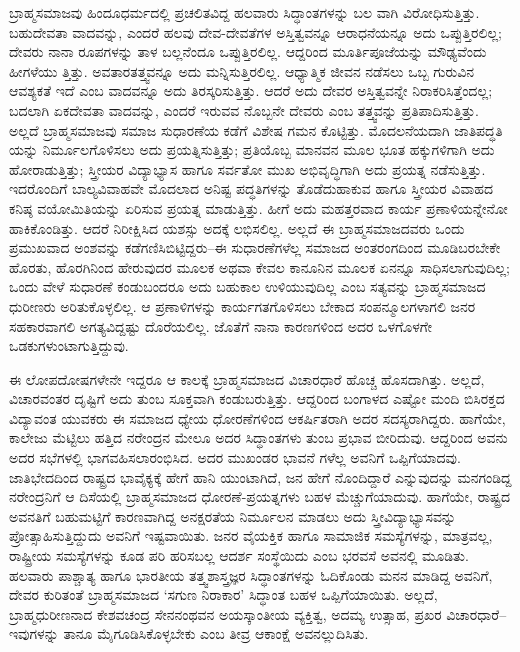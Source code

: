 ಬ್ರಾಹ್ಮಸಮಾಜವು ಹಿಂದೂಧರ್ಮದಲ್ಲಿ ಪ್ರಚಲಿತವಿದ್ದ ಹಲವಾರು ಸಿದ್ಧಾಂತಗಳನ್ನು ಬಲ ವಾಗಿ ವಿರೋಧಿಸುತ್ತಿತ್ತು. ಬಹುದೇವತಾ ವಾದವನ್ನು, ಎಂದರೆ ಹಲವು ದೇವ-ದೇವತೆಗಳ ಅಸ್ತಿತ್ವವನ್ನೂ ಆರಾಧನೆಯನ್ನೂ ಅದು ಒಪ್ಪುತ್ತಿರಲಿಲ್ಲ; ದೇವರು ನಾನಾ ರೂಪಗಳನ್ನು ತಾಳ ಬಲ್ಲನೆಂದೂ ಒಪ್ಪುತ್ತಿರಲಿಲ್ಲ. ಆದ್ದರಿಂದ ಮೂರ್ತಿಪೂಜೆಯನ್ನು ಮೌಢ್ಯವೆಂದು ಹೀಗಳೆಯು ತ್ತಿತ್ತು. ಅವತಾರತತ್ತ್ವವನ್ನೂ ಅದು ಮನ್ನಿಸುತ್ತಿರಲಿಲ್ಲ. ಆಧ್ಯಾತ್ಮಿಕ ಜೀವನ ನಡೆಸಲು ಒಬ್ಬ ಗುರುವಿನ ಆವಶ್ಯಕತೆ ಇದೆ ಎಂಬ ವಾದವನ್ನೂ ಅದು ತಿರಸ್ಕರಿಸುತ್ತಿತ್ತು. ಆದರೆ ಅದು ದೇವರ ಅಸ್ತಿತ್ವವನ್ನೇ ನಿರಾಕರಿಸಿತ್ತೆಂದಲ್ಲ; ಬದಲಾಗಿ ಏಕದೇವತಾ ವಾದವನ್ನು, ಎಂದರೆ ಇರುವವ ನೊಬ್ಬನೇ ದೇವರು ಎಂಬ ತತ್ತ್ವವನ್ನು ಪ್ರತಿಪಾದಿಸುತ್ತಿತ್ತು. ಅಲ್ಲದೆ ಬ್ರಾಹ್ಮಸಮಾಜವು ಸಮಾಜ ಸುಧಾರಣೆಯ ಕಡೆಗೆ ವಿಶೇಷ ಗಮನ ಕೊಟ್ಟಿತ್ತು. ಮೊದಲನೆಯದಾಗಿ ಜಾತಿಪದ್ಧತಿ ಯನ್ನು ನಿರ್ಮೂಲಗೊಳಿಸಲು ಅದು ಪ್ರಯತ್ನಿಸುತ್ತಿತ್ತು; ಪ್ರತಿಯೊಬ್ಬ ಮಾನವನ ಮೂಲ ಭೂತ ಹಕ್ಕುಗಳಿಗಾಗಿ ಅದು ಹೋರಾಡುತ್ತಿತ್ತು; ಸ್ತ್ರೀಯರ ವಿದ್ಯಾಭ್ಯಾಸ ಹಾಗೂ ಸರ್ವತೋ ಮುಖ ಅಭಿವೃದ್ಧಿಗಾಗಿ ಅದು ಪ್ರಯತ್ನ ನಡೆಸುತ್ತಿತ್ತು. ಇದರೊಂದಿಗೆ ಬಾಲ್ಯವಿವಾಹವೇ ಮೊದಲಾದ ಅನಿಷ್ಟ ಪದ್ಧತಿಗಳನ್ನು ತೊಡೆದುಹಾಕುವ ಹಾಗೂ ಸ್ತ್ರೀಯರ ವಿವಾಹದ ಕನಿಷ್ಠ ವಯೋಮಿತಿಯನ್ನು ಏರಿಸುವ ಪ್ರಯತ್ನ ಮಾಡುತ್ತಿತ್ತು. ಹೀಗೆ ಅದು ಮಹತ್ತರವಾದ ಕಾರ್ಯ ಪ್ರಣಾಳಿಯನ್ನೇನೋ ಹಾಕಿಕೊಂಡಿತ್ತು. ಆದರೆ ನಿರೀಕ್ಷಿಸಿದ ಯಶಸ್ಸು ಅದಕ್ಕೆ ಲಭಿಸಲಿಲ್ಲ. ಅಲ್ಲದೆ ಈ ಬ್ರಾಹ್ಮಸಮಾಜದವರು ಒಂದು ಪ್ರಮುಖವಾದ ಅಂಶವನ್ನು ಕಡೆಗಣಿಸಿಬಿಟ್ಟಿದ್ದರು–ಈ ಸುಧಾರಣೆಗಳೆಲ್ಲ ಸಮಾಜದ ಅಂತರಂಗದಿಂದ ಮೂಡಿಬರಬೇಕೇ ಹೊರತು, ಹೊರಗಿನಿಂದ ಹೇರುವುದರ ಮೂಲಕ ಅಥವಾ ಕೇವಲ ಕಾನೂನಿನ ಮೂಲಕ ಏನನ್ನೂ ಸಾಧಿಸಲಾಗುವುದಿಲ್ಲ; ಒಂದು ವೇಳೆ ಸುಧಾರಣೆ ಕಂಡುಬಂದರೂ ಅದು ಬಹುಕಾಲ ಉಳಿಯುವುದಿಲ್ಲ ಎಂಬ ಸತ್ಯವನ್ನು ಬ್ರಾಹ್ಮಸಮಾಜದ ಧುರೀಣರು ಅರಿತುಕೊಳ್ಳಲಿಲ್ಲ. ಆ ಪ್ರಣಾಳಿಗಳನ್ನು ಕಾರ್ಯಗತಗೊಳಿಸಲು ಬೇಕಾದ ಸಂಪನ್ಮೂಲಗಳಾಗಲಿ ಜನರ ಸಹಕಾರವಾಗಲಿ ಅಗತ್ಯವಿದ್ದಷ್ಟು ದೊರೆಯಲಿಲ್ಲ. ಜೊತೆಗೆ ನಾನಾ ಕಾರಣಗಳಿಂದ ಅದರ ಒಳಗೊಳಗೇ ಒಡಕುಗಳುಂಟಾಗುತ್ತಿದ್ದುವು.

ಈ ಲೋಪದೋಷಗಳೇನೇ ಇದ್ದರೂ ಆ ಕಾಲಕ್ಕೆ ಬ್ರಾಹ್ಮಸಮಾಜದ ವಿಚಾರಧಾರೆ ಹೊಚ್ಚ ಹೊಸದಾಗಿತ್ತು. ಅಲ್ಲದೆ, ವಿಚಾರವಂತರ ದೃಷ್ಟಿಗೆ ಅದು ತುಂಬ ಸೂಕ್ತವಾಗಿ ಕಂಡುಬರುತ್ತಿತ್ತು. ಆದ್ದರಿಂದ ಬಂಗಾಳದ ಎಷ್ಟೋ ಮಂದಿ ಬಿಸಿರಕ್ತದ ವಿದ್ಯಾವಂತ ಯುವಕರು ಈ ಸಮಾಜದ ಧ್ಯೇಯ ಧೋರಣೆಗಳಿಂದ ಆಕರ್ಷಿತರಾಗಿ ಅದರ ಸದಸ್ಯರಾಗಿದ್ದರು. ಹಾಗೆಯೇ, ಕಾಲೇಜು ಮೆಟ್ಟಿಲು ಹತ್ತಿದ ನರೇಂದ್ರನ ಮೇಲೂ ಅದರ ಸಿದ್ಧಾಂತಗಳು ತುಂಬ ಪ್ರಭಾವ ಬೀರಿದುವು. ಆದ್ದರಿಂದ ಅವನು ಅದರ ಸಭೆಗಳಲ್ಲಿ ಭಾಗವಹಿಸಲಾರಂಭಿಸಿದ. ಅದರ ಮುಖಂಡರ ಭಾವನೆ ಗಳೆಲ್ಲ ಅವನಿಗೆ ಒಪ್ಪಿಗೆಯಾದವು. ಜಾತಿಭೇದದಿಂದ ರಾಷ್ಟ್ರದ ಭಾವೈಕ್ಯಕ್ಕೆ ಹೇಗೆ ಹಾನಿ ಯುಂಟಾಗಿದೆ, ಜನ ಹೇಗೆ ನೊಂದಿದ್ದಾರೆ ಎನ್ನುವುದನ್ನು ಮನಗಂಡಿದ್ದ ನರೇಂದ್ರನಿಗೆ ಆ ದಿಸೆಯಲ್ಲಿ ಬ್ರಾಹ್ಮಸಮಾಜದ ಧೋರಣೆ-ಪ್ರಯತ್ನಗಳು ಬಹಳ ಮೆಚ್ಚುಗೆಯಾದುವು. ಹಾಗೆಯೇ, ರಾಷ್ಟ್ರದ ಅವನತಿಗೆ ಬಹುಮಟ್ಟಿಗೆ ಕಾರಣವಾಗಿದ್ದ ಅನಕ್ಷರತೆಯ ನಿರ್ಮೂಲನ ಮಾಡಲು ಅದು ಸ್ತ್ರೀವಿದ್ಯಾಭ್ಯಾಸವನ್ನು ಪ್ರೋತ್ಸಾಹಿಸುತ್ತಿದ್ದುದು ಅವನಿಗೆ ಇಷ್ಟವಾಯಿತು. ಜನರ ವೈಯಕ್ತಿಕ ಹಾಗೂ ಸಾಮಾಜಿಕ ಸಮಸ್ಯೆಗಳನ್ನು, ಮಾತ್ರವಲ್ಲ, ರಾಷ್ಟ್ರೀಯ ಸಮಸ್ಯೆಗಳನ್ನು ಕೂಡ ಪರಿ ಹರಿಸಬಲ್ಲ ಆದರ್ಶ ಸಂಸ್ಥೆಯಿದು ಎಂಬ ಭರವಸೆ ಅವನಲ್ಲಿ ಮೂಡಿತು. ಹಲವಾರು ಪಾಶ್ಚಾತ್ಯ ಹಾಗೂ ಭಾರತೀಯ ತತ್ತ್ವಶಾಸ್ತ್ರಜ್ಞರ ಸಿದ್ಧಾಂತಗಳನ್ನು ಓದಿಕೊಂಡು ಮನನ ಮಾಡಿದ್ದ ಅವನಿಗೆ, ದೇವರ ಕುರಿತಂತೆ ಬ್ರಾಹ್ಮಸಮಾಜದ ‘ಸಗುಣ ನಿರಾಕಾರ’ ಸಿದ್ಧಾಂತ ಬಹಳ ಒಪ್ಪಿಗೆಯಾಯಿತು. ಅಲ್ಲದೆ, ಬ್ರಾಹ್ಮಧುರೀಣನಾದ ಕೇಶವಚಂದ್ರ ಸೇನನಂಥವನ ಅಯಸ್ಕಾಂತೀಯ ವ್ಯಕ್ತಿತ್ವ, ಅದಮ್ಯ ಉತ್ಸಾಹ, ಪ್ರಖರ ವಿಚಾರಧಾರೆ–ಇವುಗಳನ್ನು ತಾನೂ ಮೈಗೂಡಿಸಿಕೊಳ್ಳಬೇಕು ಎಂಬ ತೀವ್ರ ಆಕಾಂಕ್ಷೆ ಅವನಲ್ಲುದಿಸಿತು.

